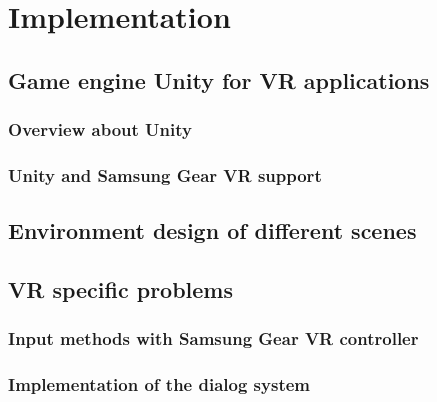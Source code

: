 \chapter{Implementation}
\section{Game engine Unity for VR applications}
\subsection{Overview about Unity}
\subsection{Unity and Samsung Gear VR support}
\section{Environment design of different scenes}
\section{VR specific problems}
\subsection{Input methods with Samsung Gear VR controller}
\subsection{Implementation of the dialog system}